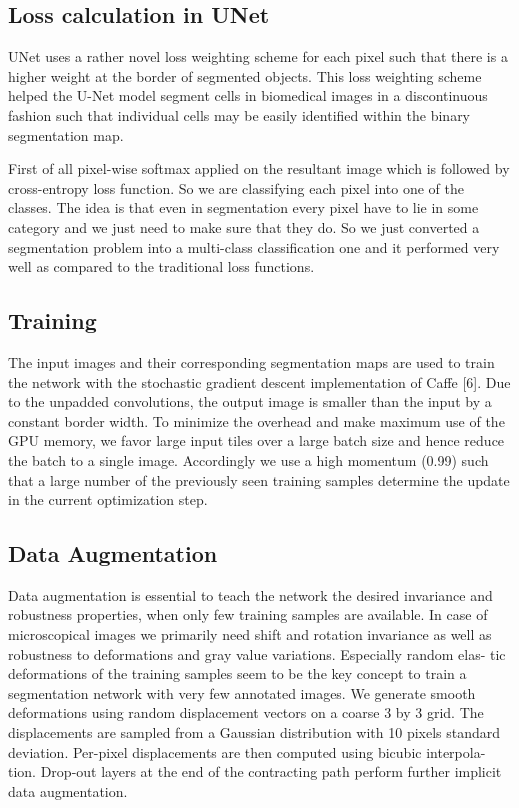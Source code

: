 \begin{enumerate}
    \subsection{Loss calculation in UNet}
    UNet uses a rather novel loss weighting scheme for each pixel such that there is a higher weight at the border of segmented objects. This loss weighting scheme helped the U-Net model segment cells in biomedical images in a discontinuous fashion such that individual cells may be easily identified within the binary segmentation map.

    First of all pixel-wise softmax applied on the resultant image which is followed by cross-entropy loss function. So we are classifying each pixel into one of the classes. The idea is that even in segmentation every pixel have to lie in some category and we just need to make sure that they do. So we just converted a segmentation problem into a multi-class classification one and it performed very well as compared to the traditional loss functions.

    \subsection{Training}
    The input images and their corresponding segmentation maps are used to train the network with the stochastic gradient descent implementation of Caffe [6]. Due to the unpadded convolutions, the output image is smaller than the input by a constant border width. To minimize the overhead and make maximum use of the GPU memory, we favor large input tiles over a large batch size and hence reduce the batch to a single image. Accordingly we use a high momentum (0.99) such that a large number of the previously seen training samples determine the update in the current optimization step.
    
    \subsection{Data Augmentation}
    Data augmentation is essential to teach the network the desired invariance and robustness properties, when only few training samples are available. In case of microscopical images we primarily need shift and rotation invariance as well as robustness to deformations and gray value variations. Especially random elas- tic deformations of the training samples seem to be the key concept to train a segmentation network with very few annotated images. We generate smooth deformations using random displacement vectors on a coarse 3 by 3 grid. The displacements are sampled from a Gaussian distribution with 10 pixels standard deviation. Per-pixel displacements are then computed using bicubic interpola- tion. Drop-out layers at the end of the contracting path perform further implicit data augmentation.

    
\end{enumerate}



      
 
